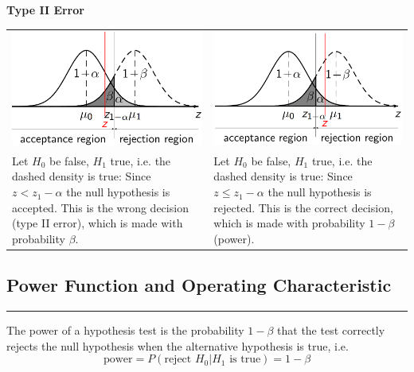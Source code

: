 \textbf{Type II Error}\\
\begin{table}[H]
  \setlength{\tabcolsep}{0.0em}
  \scriptsize
  \begin{tabular}{p{}@{\hskip 1em}p{}}
    \includegraphics[width=\linewidth]{Pics/3.2.3.png}& \includegraphics[width=\linewidth]{Pics/3.2.4.png} \\
    Let $H_0$ be false, $H_1$ true, i.e. the dashed density is true: Since $z < z_1-\alpha$ the null hypothesis is accepted. This is the wrong decision (type II error), which is made with probability $\beta$. &
    Let $H_0$ be false, $H_1$ true, i.e. the dashed density is true: Since $z \leq z_1-\alpha$ the null hypothesis is rejected. This is the correct decision, which is made with probability $1 - \beta$ (power).
  \end{tabular}
\end{table}

\subsection{Power Function and Operating Characteristic}
\noindent\rule[\linienAbstand]{\linewidth}{\linienDicke}
The power of a hypothesis test is the probability $1-\beta$ that the test correctly rejects the null hypothesis when the alternative hypothesis is true, i.e.
\begin{equation}
  \text{power} = P(\text{reject } H_0 | H_1 \text{ is true}) = 1-\beta
\end{equation}

